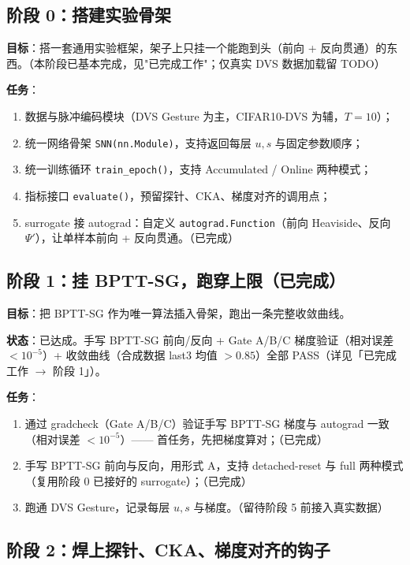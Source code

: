 \documentclass[journal,12pt,onecolumn]{IEEEtran}
\begin{document}
\subsection{阶段 0：搭建实验骨架}

\textbf{目标}：搭一套通用实验框架，架子上只挂一个能跑到头（前向 + 反向贯通）的东西。（本阶段已基本完成，见"已完成工作"；仅真实 DVS 数据加载留 TODO）

\textbf{任务}：
\begin{enumerate}[leftmargin=1.5em,itemsep=0pt]
\item 数据与脉冲编码模块（DVS Gesture 为主，CIFAR10-DVS 为辅，$T=10$）；
\item 统一网络骨架 \texttt{SNN(nn.Module)}，支持返回每层 $u, s$ 与固定参数顺序；
\item 统一训练循环 \texttt{train\_epoch()}，支持 Accumulated / Online 两种模式；
\item 指标接口 \texttt{evaluate()}，预留探针、CKA、梯度对齐的调用点；
\item surrogate 接 autograd：自定义 \texttt{autograd.Function}（前向 Heaviside、反向 $\Psi'$），让单样本前向 + 反向贯通。（已完成）
\end{enumerate}

\subsection{阶段 1：挂 BPTT-SG，跑穿上限（已完成）}

\textbf{目标}：把 BPTT-SG 作为唯一算法插入骨架，跑出一条完整收敛曲线。

\textbf{状态}：已达成。手写 BPTT-SG 前向/反向 + Gate A/B/C 梯度验证（相对误差 $<10^{-5}$）+ 收敛曲线（合成数据 last3 均值 $>0.85$）全部 PASS（详见「已完成工作 $\to$ 阶段 1」）。

\textbf{任务}：
\begin{enumerate}[leftmargin=1.5em,itemsep=0pt]
\item 通过 gradcheck（Gate A/B/C）验证手写 BPTT-SG 梯度与 autograd 一致（相对误差 $<10^{-5}$）—— 首任务，先把梯度算对；（已完成）
\item 手写 BPTT-SG 前向与反向，用形式 A，支持 detached-reset 与 full 两种模式（复用阶段 0 已接好的 surrogate）；（已完成）
\item 跑通 DVS Gesture，记录每层 $u, s$ 与梯度。（留待阶段 5 前接入真实数据）
\end{enumerate}

\subsection{阶段 2：焊上探针、CKA、梯度对齐的钩子}
\end{document}
